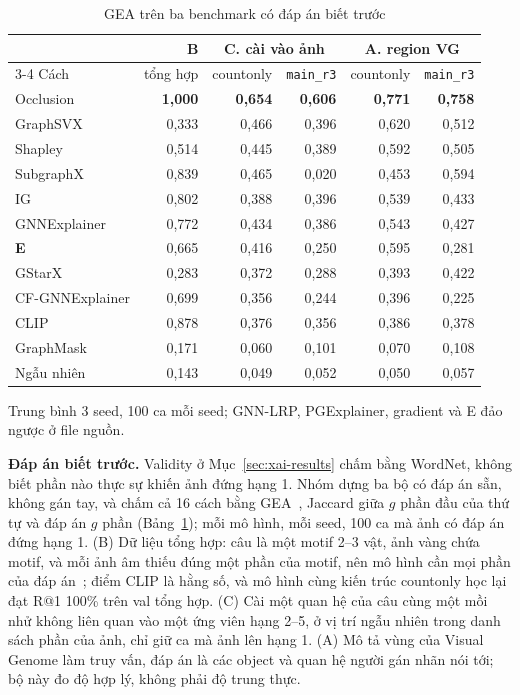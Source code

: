 \begin{table}[t]
  \caption{GEA trên ba benchmark có đáp án biết trước}
  \label{tab:xai-gt}
  \centering
  \footnotesize
  \setlength{\tabcolsep}{3pt}
  \begin{tabular}{@{}lrrrrr@{}}
    \toprule
    & B & \multicolumn{2}{c}{C. cài vào ảnh} & \multicolumn{2}{c}{A. region VG} \\
    \cmidrule{3-4}\cmidrule{5-6}
    Cách & tổng hợp & countonly & \texttt{main\_r3} & countonly & \texttt{main\_r3} \\
    \midrule
    Occlusion & \textbf{1,000} & \textbf{0,654} & \textbf{0,606} & \textbf{0,771} & \textbf{0,758} \\
    GraphSVX & 0,333 & 0,466 & 0,396 & 0,620 & 0,512 \\
    Shapley & 0,514 & 0,445 & 0,389 & 0,592 & 0,505 \\
    SubgraphX & 0,839 & 0,465 & 0,020 & 0,453 & 0,594 \\
    IG & 0,802 & 0,388 & 0,396 & 0,539 & 0,433 \\
    GNNExplainer & 0,772 & 0,434 & 0,386 & 0,543 & 0,427 \\
    \textbf{E} & 0,665 & 0,416 & 0,250 & 0,595 & 0,281 \\
    GStarX & 0,283 & 0,372 & 0,288 & 0,393 & 0,422 \\
    CF-GNNExplainer & 0,699 & 0,356 & 0,244 & 0,396 & 0,225 \\
    CLIP & 0,878 & 0,376 & 0,356 & 0,386 & 0,378 \\
    GraphMask & 0,171 & 0,060 & 0,101 & 0,070 & 0,108 \\
    Ngẫu nhiên & 0,143 & 0,049 & 0,052 & 0,050 & 0,057 \\
    \bottomrule
  \end{tabular}
  \par\smallskip
  {\scriptsize\raggedright
    Trung bình 3 seed, 100 ca mỗi seed; GNN-LRP, PGExplainer, gradient và E đảo ngược ở file nguồn.\par}
\end{table}

\textbf{Đáp án biết trước.}
Validity ở Mục~\ref{sec:xai-results} chấm bằng WordNet, không biết phần nào thực sự khiến ảnh đứng hạng 1.
Nhóm dựng ba bộ có đáp án sẵn, không gán tay, và chấm cả 16 cách bằng GEA~\cite{xai-agarwal2023graphxai}, Jaccard giữa $g$ phần đầu của thứ tự và đáp án $g$ phần (Bảng~\ref{tab:xai-gt}); mỗi mô hình, mỗi seed, 100 ca mà ảnh có đáp án đứng hạng 1.
(B) Dữ liệu tổng hợp: câu là một motif 2--3 vật, ảnh vàng chứa motif, và mỗi ảnh âm thiếu đúng một phần của motif, nên mô hình cần mọi phần của đáp án~\cite{xai-faber2021groundtruth}; điểm CLIP là hằng số, và mô hình cùng kiến trúc countonly học lại đạt R@1 100\% trên val tổng hợp.
(C) Cài một quan hệ của câu cùng một mồi nhử không liên quan vào một ứng viên hạng 2--5, ở vị trí ngẫu nhiên trong danh sách phần của ảnh, chỉ giữ ca mà ảnh lên hạng 1.
(A) Mô tả vùng của Visual Genome làm truy vấn, đáp án là các object và quan hệ người gán nhãn nói tới; bộ này đo độ hợp lý, không phải độ trung thực.

